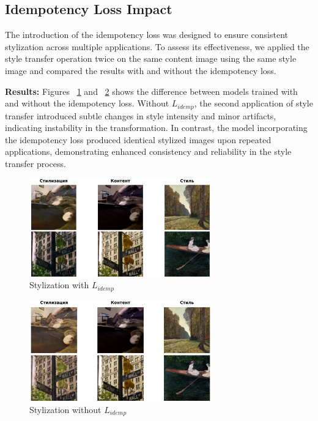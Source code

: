 \documentclass{article}
\begin{document}
\subsection{Idempotency Loss Impact}
The introduction of the idempotency loss was designed to ensure consistent stylization across multiple applications. To assess its effectiveness, we applied the style transfer operation twice on the same content image using the same style image and compared the results with and without the idempotency loss.

\textbf{Results:} Figures ~\ref{fig:idempotency_result} and ~\ref{fig:without_idempotency_result} shows the difference between models trained with and without the idempotency loss. Without $L_{idemp}$, the second application of style transfer introduced subtle changes in style intensity and minor artifacts, indicating instability in the transformation. In contrast, the model incorporating the idempotency loss produced identical stylized images upon repeated applications, demonstrating enhanced consistency and reliability in the style transfer process.

\begin{figure}[H]
    \centering
    \includegraphics[width=0.7\textwidth]{figures/idempotency.png}
    \caption{Stylization with $L_{idemp}$}
    \label{fig:idempotency_result}
\end{figure}

\begin{figure}[H]
    \centering
    \includegraphics[width=0.7\textwidth]{figures/without_idempotency.png}
    \caption{Stylization without $L_{idemp}$}
    \label{fig:without_idempotency_result}
\end{figure}
\end{document}
